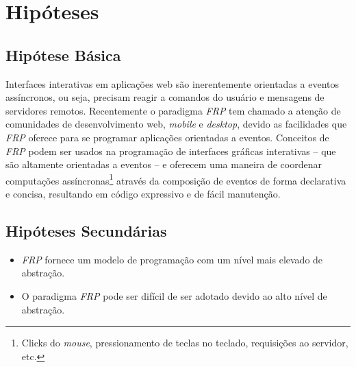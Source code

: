 \section{Hipóteses}\label{lhipoteses}


\subsection{Hipótese Básica}

Interfaces interativas em aplicações web
são inerentemente orientadas a eventos assíncronos,
ou seja, precisam reagir a comandos do usuário e
mensagens de servidores remotos.
Recentemente o paradigma \emph{FRP}
tem chamado a atenção de
comunidades de desenvolvimento web, \emph{mobile}
e \emph{desktop}, devido as facilidades que \emph{FRP}
oferece para se programar aplicações orientadas a eventos.
Conceitos de \emph{FRP} podem ser usados
na programação de interfaces gráficas interativas
-- que são altamente orientadas a eventos --
e oferecem uma maneira de coordenar
computações assíncronas\footnote{
  Clicks do \emph{mouse}, pressionamento de teclas no teclado,
  requisições ao servidor, etc.
}
através da composição de eventos de forma declarativa
e concisa, resultando em código expressivo e de fácil
manutenção.


\subsection{Hipóteses Secundárias}

\begin{itemize}[noitemsep]
  \item \emph{FRP} fornece um modelo de programação com um
        nível mais elevado de abstração.
  \item O paradigma \emph{FRP} pode ser difícil de ser adotado
        devido ao alto nível de abstração.
\end{itemize}

